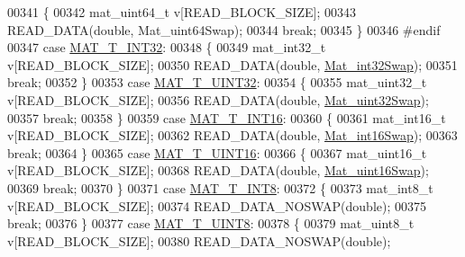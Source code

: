 \begin{DoxyCode}
00341         \{
00342             mat\_uint64\_t v[READ\_BLOCK\_SIZE];
00343             READ\_DATA(\textcolor{keywordtype}{double}, Mat\_uint64Swap);
00344             \textcolor{keywordflow}{break};
00345         \}
00346 \textcolor{preprocessor}{#endif}
00347         \textcolor{keywordflow}{case} \hyperlink{group___m_a_t_ggacf7b3b879282b7ab3a51190e49bf3453a83e06a68320726c6572bfbb9f3addb1d}{MAT\_T\_INT32}:
00348         \{
00349             mat\_int32\_t v[READ\_BLOCK\_SIZE];
00350             READ\_DATA(\textcolor{keywordtype}{double}, \hyperlink{endian_8c_a2e0153996243f0a34df9a5286087cfa3}{Mat\_int32Swap});
00351             \textcolor{keywordflow}{break};
00352         \}
00353         \textcolor{keywordflow}{case} \hyperlink{group___m_a_t_ggacf7b3b879282b7ab3a51190e49bf3453aa397e285a23fe240368b752897652c6a}{MAT\_T\_UINT32}:
00354         \{
00355             mat\_uint32\_t v[READ\_BLOCK\_SIZE];
00356             READ\_DATA(\textcolor{keywordtype}{double}, \hyperlink{endian_8c_a8cb0d0750e2eaf9840d95db531934f4f}{Mat\_uint32Swap});
00357             \textcolor{keywordflow}{break};
00358         \}
00359         \textcolor{keywordflow}{case} \hyperlink{group___m_a_t_ggacf7b3b879282b7ab3a51190e49bf3453a8c5b2e381946e95ea8d81ac216743302}{MAT\_T\_INT16}:
00360         \{
00361             mat\_int16\_t v[READ\_BLOCK\_SIZE];
00362             READ\_DATA(\textcolor{keywordtype}{double}, \hyperlink{endian_8c_a741eb8019dbc3e8addfc0e75adb0dd90}{Mat\_int16Swap});
00363             \textcolor{keywordflow}{break};
00364         \}
00365         \textcolor{keywordflow}{case} \hyperlink{group___m_a_t_ggacf7b3b879282b7ab3a51190e49bf3453a05bc7af7680aa68be95126ae0a4c2e31}{MAT\_T\_UINT16}:
00366         \{
00367             mat\_uint16\_t v[READ\_BLOCK\_SIZE];
00368             READ\_DATA(\textcolor{keywordtype}{double}, \hyperlink{endian_8c_a0fd527794c69f2872e80a6f20cd09fd2}{Mat\_uint16Swap});
00369             \textcolor{keywordflow}{break};
00370         \}
00371         \textcolor{keywordflow}{case} \hyperlink{group___m_a_t_ggacf7b3b879282b7ab3a51190e49bf3453a9807f5033ed4f9b548953742d9fd1658}{MAT\_T\_INT8}:
00372         \{
00373             mat\_int8\_t v[READ\_BLOCK\_SIZE];
00374             READ\_DATA\_NOSWAP(\textcolor{keywordtype}{double});
00375             \textcolor{keywordflow}{break};
00376         \}
00377         \textcolor{keywordflow}{case} \hyperlink{group___m_a_t_ggacf7b3b879282b7ab3a51190e49bf3453a01c1bd7db68f90552862eb5d311be408}{MAT\_T\_UINT8}:
00378         \{
00379             mat\_uint8\_t v[READ\_BLOCK\_SIZE];
00380             READ\_DATA\_NOSWAP(\textcolor{keywordtype}{double});

\end{DoxyCode}
